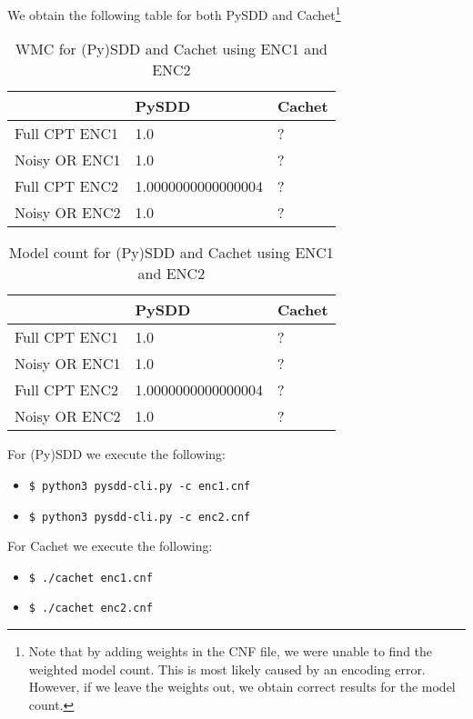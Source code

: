 \documentclass{article}
\begin{document}
We obtain the following table for both PySDD and Cachet\footnote{Note that by adding weights in the CNF file, we were unable to find the weighted model count. This is most likely caused by an encoding error. However, if we leave the weights out, we obtain correct results for the model count.}
\begin{table}[h]
\centering
\begin{tabular}{l | l l}
					&	PySDD	&		Cachet	\\\hline
	Full CPT ENC1	&	1.0		&		?		\\
	Noisy OR ENC1	&	1.0		&		?		\\
	Full CPT ENC2	&	1.0000000000000004 &	?	\\
	Noisy OR ENC2	&	1.0		&		?		\\
\end{tabular}
\caption{WMC for (Py)SDD and Cachet using ENC1 and ENC2}
\label{wmc_pysdd_cachet}
\end{table}

\begin{table}[h]
\centering
\begin{tabular}{l | l l}
					&	PySDD	&		Cachet	\\\hline
	Full CPT ENC1	&	1.0		&		?		\\
	Noisy OR ENC1	&	1.0		&		?		\\
	Full CPT ENC2	&	1.0000000000000004 &	?	\\
	Noisy OR ENC2	&	1.0		&		?		\\
\end{tabular}
\caption{Model count for (Py)SDD and Cachet using ENC1 and ENC2}
\label{mc_pysdd_cachet}
\end{table}

For (Py)SDD we execute the following:
\begin{itemize}
	\item[] \texttt{\$ python3 pysdd-cli.py -c enc1.cnf}
	\item[] \texttt{\$ python3 pysdd-cli.py -c enc2.cnf}
\end{itemize}

For Cachet we execute the following:
\begin{itemize}
	\item[] \texttt{\$ ./cachet enc1.cnf}
	\item[] \texttt{\$ ./cachet enc2.cnf}
\end{itemize}
\end{document}
